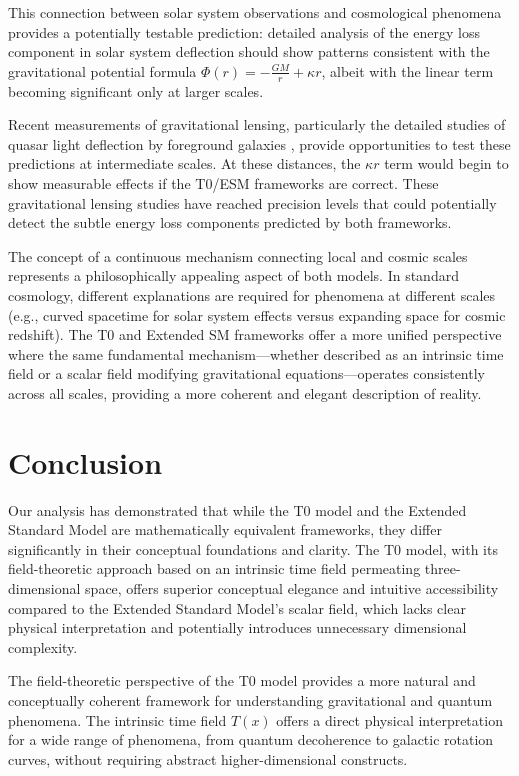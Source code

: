 \documentclass[12pt,a4paper]{article}
\newcommand{\Tfield}{T(x)}
\begin{document}
	This connection between solar system observations and cosmological phenomena provides a potentially testable prediction: detailed analysis of the energy loss component in solar system deflection should show patterns consistent with the gravitational potential formula \(\Phi(r) = -\frac{GM}{r} + \kappa r\), albeit with the linear term becoming significant only at larger scales.
	
	Recent measurements of gravitational lensing, particularly the detailed studies of quasar light deflection by foreground galaxies \cite{Bolton2008, Suyu2017}, provide opportunities to test these predictions at intermediate scales. At these distances, the \(\kappa r\) term would begin to show measurable effects if the T0/ESM frameworks are correct. These gravitational lensing studies have reached precision levels that could potentially detect the subtle energy loss components predicted by both frameworks.
	
	The concept of a continuous mechanism connecting local and cosmic scales represents a philosophically appealing aspect of both models. In standard cosmology, different explanations are required for phenomena at different scales (e.g., curved spacetime for solar system effects versus expanding space for cosmic redshift). The T0 and Extended SM frameworks offer a more unified perspective where the same fundamental mechanism—whether described as an intrinsic time field or a scalar field modifying gravitational equations—operates consistently across all scales, providing a more coherent and elegant description of reality.
	
	\section{Conclusion}
	\label{sec:conclusion}
	
	Our analysis has demonstrated that while the T0 model and the Extended Standard Model are mathematically equivalent frameworks, they differ significantly in their conceptual foundations and clarity. The T0 model, with its field-theoretic approach based on an intrinsic time field permeating three-dimensional space, offers superior conceptual elegance and intuitive accessibility compared to the Extended Standard Model's scalar field, which lacks clear physical interpretation and potentially introduces unnecessary dimensional complexity.
	
	The field-theoretic perspective of the T0 model provides a more natural and conceptually coherent framework for understanding gravitational and quantum phenomena. The intrinsic time field \(\Tfield\) offers a direct physical interpretation for a wide range of phenomena, from quantum decoherence to galactic rotation curves, without requiring abstract higher-dimensional constructs.
	
\end{document}
